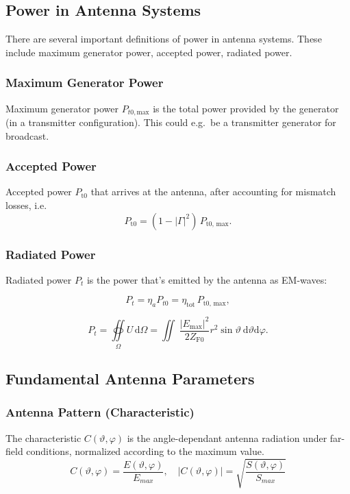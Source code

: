 \subsection{Power in Antenna Systems}
There are several important definitions of power in antenna systems.
These include maximum generator power, accepted power, radiated power.

\subsubsection{Maximum Generator Power}
Maximum generator power $P_{t0, \text{max}}$ is the total power provided by the generator (in a transmitter configuration).
This could e.g.\ be a transmitter generator for broadcast.

\subsubsection{Accepted Power}
Accepted power $P_{\text{t0}}$ that arrives at the antenna, after accounting for mismatch losses, i.e.\
\begin{equation*}
  P_{\text{t0}} = (1 - |\Gamma|^{2}) \, P_{\text{t0, max}}.
\end{equation*}

\subsubsection{Radiated Power}
Radiated power $P_{t}$ is the power that's emitted by the antenna as EM-waves:

\begin{equation*}
    P_t = \eta_a P_{t0} = \eta_{\text{tot}} \, P_{\text{t0, max}},
\end{equation*}

\begin{equation*}
  P_{t} = \oiint\limits_{\Omega} U \,\mathrm{d}\Omega = \iint\ \dfrac{{|E_{\text{max}}|}^{2}}{2 Z_{\text{F0}}} r^{2}\sin\vartheta \: \mathrm{d}\vartheta\mathrm{d}\varphi.
\end{equation*}


\subsection{Fundamental Antenna Parameters}
\subsubsection{Antenna Pattern (Characteristic)}
The characteristic $C(\vartheta, \varphi)$ is the angle-dependant antenna radiation under far-field conditions, normalized according to the maximum value.
    \begin{equation*}
        C(\vartheta, \varphi) = \dfrac{E(\vartheta, \varphi)}{E_{max}}, \quad
        |C(\vartheta, \varphi)| = \sqrt{\dfrac{S(\vartheta, \varphi)}{S_{max}}}
    \end{equation*}

